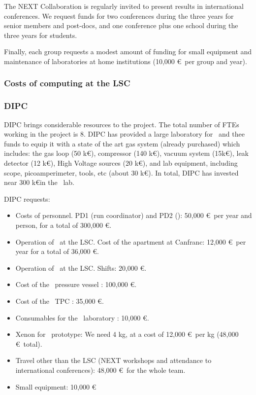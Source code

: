 The NEXT Collaboration is regularly invited to present results in international conferences. We request funds for two conferences during the three years for senior members and post-docs, and one conference plus one school during the three years for students.

Finally, each group requests a modest amount of funding for small equipment and maintenance of laboratories at home institutions (10,000 \euro\ per group and year). 

\subsubsection{Costs of computing at the LSC}

\subsubsection{DIPC}

DIPC brings considerable resources to the project. The total number of FTEs working in the project is 8. DIPC has provided a large laboratory for \HDEMO\ and thee funds to equip it with a state of the art gas system (already purchased) which includes: the gas loop (50 k\euro), compressor (140 k€),
vacuum system (15k\euro), leak detector (12 k\euro), High Voltage sources (20 k\euro), and lab equipment, including scope, picoamperimeter, tools, etc 
(about 30 k\euro). In total, DIPC has invested near 300 k\euro in the \HDEMO\ lab. 
 
DIPC requests:

\begin{itemize}[noitemsep,topsep=0pt,parsep=0pt,partopsep=0pt]
\item Costs of personnel. PD1 (run coordinator) and PD2 (\HDEMO):  50,000 \euro\ per year and person, for a total of 300,000 \euro. 
\item Operation of \Next\ at the LSC. Cost of the apartment at Canfranc: 12,000 \euro\ per year for a total of 36,000 \euro. 
\item Operation of \Next\ at the LSC. Shifts: 20,000 \euro.
\item Cost of the \HDEMO\ pressure vessel : 100,000 \euro.
\item Cost of the \HDEMO\ TPC : 35,000 \euro.
\item Consumables for the \HDEMO\ laboratory : 10,000 \euro.
\item Xenon for \HDEMO\ prototype: We need 4 kg, at a cost of  12,000 \euro\ per kg (48,000 \euro\ total). 
\item Travel other than the LSC (NEXT workshops and attendance to international conferences): 48,000 \euro\ for the whole team. 
\item Small equipment: 10,000 \euro
\end{itemize}

